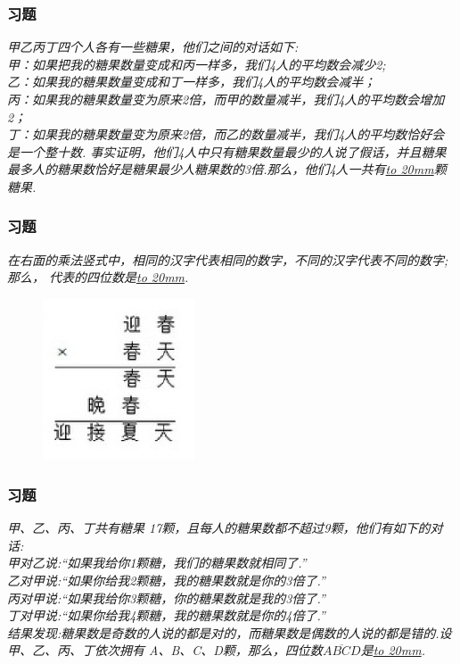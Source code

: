 \begin{frame}
    \frametitle{习题\theframecounter}
    \textit{甲乙丙丁四个人各有一些糖果，他们之间的对话如下:\\
    甲：如果把我的糖果数量变成和丙一样多，我们4人的平均数会减少2;\\
    乙：如果我的糖果数量变成和丁一样多，我们4人的平均数会减半；\\
    丙：如果我的糖果数量变为原来2倍，而甲的数量减半，我们4人的平均数会增加 2；\\
    丁：如果我的糖果数量变为原来2倍，而乙的数量减半，我们4人的平均数恰好会是一个整十数.
事实证明，他们4人中只有糖果数量最少的人说了假话，并且糖果最多人的糖果数恰好是糖果最少人糖果数的3倍.那么，他们4人一共有\underline{\hbox to 20mm{}}颗糖果.}
\end{frame}

\begin{frame}
    \frametitle{习题\theframecounter}
    \textit{在右面的乘法竖式中，相同的汉字代表相同的数字，不同的汉字代表不同的数字;那么， 代表的四位数是\underline{\hbox to 20mm{}}.}
    \begin{figure}[H] 
        \centering
        \includegraphics[width=0.4\textwidth]{./pics/Chapter_7/14.png}
    \end{figure}
\end{frame}

\begin{frame}
    \frametitle{习题\theframecounter}
    \textit{甲、乙、丙、丁共有糖果 17颗，且每人的糖果数都不超过9颗，他们有如下的对话:\\
    甲对乙说:``如果我给你1颗糖，我们的糖果数就相同了.''\\
    乙对甲说:``如果你给我2颗糖，我的糖果数就是你的3倍了.''\\
    丙对甲说:``如果我给你3颗糖，你的糖果数就是我的3倍了.''\\
    丁对甲说:``如果你给我4颗糖，我的糖果数就是你的4倍了.''\\
    结果发现:糖果数是奇数的人说的都是对的，而糖果数是偶数的人说的都是错的.设甲、乙、丙、丁依次拥有 A、B、C、D颗，那么，四位数$\overline{ABCD}$是\underline{\hbox to 20mm{}}.}
\end{frame}